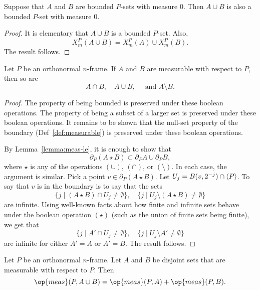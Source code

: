 \begin{lemma}  Suppose that $A$ and $B$ are bounded $P$-sets with
measure $0$.  Then $A\cup B$ is also a bounded $P$-set with measure
$0$.
\end{lemma}

\begin{proof}  It is elementary that $A\cup B$ is a bounded $P$-set.
Also, $$X^P_m(A\cup B) = X^P_m(A)\cup X^P_m(B).$$  The result
follows.
\end{proof}

\begin{lemma}
    Let $P$ be an orthonormal $n$-frame.
    If $A$ and $B$ are measurable with respect to $P$, then so are
    $$A\cap B,\quad A\cup B,\quad\text{ and }A\setminus B.$$
\end{lemma}

\begin{proof}  The property of being  bounded is preserved under
these boolean operations.  The property of being a subset of a
larger set is preserved under these boolean operations.  It remains
to be shown that the null-set property of the boundary
(Def~\ref{def:measurable}) is preserved under these boolean
operations.

By Lemma~\ref{lemma:meas-le}, it is enough to show that
    $$\partial_P (A \star B) \subset \partial_P A \cup \partial_P
    B,$$
where $\star$ is any of the operations $(\cup)$, $(\cap)$, or
$(\setminus)$.  In each case, the argument is similar.  Pick a point
$v\in\partial_P(A\star B)$. Let $U_j = B(v,2^{-j})\cap{\langle P\rangle}$. To
say that $v$ is in the boundary is to say that the sets
    $$
    \{j \mid (A\star B)\cap U_j\ne\emptyset\},\quad
    \{j \mid U_j\setminus (A\star B)\ne\emptyset\}
    $$
are infinite. Using well-known facts about how finite and infinite
sets behave under the boolean operation $(\star)$ (such as the union
of finite sets being finite), we get that
    $$
    \{j \mid A'\cap U_j\ne\emptyset\},\quad
    \{j \mid U_j\setminus A'\ne\emptyset\}
    $$
are infinite for either $A'=A$ or $A'=B$.  The result follows.
\end{proof}

\begin{lemma}\label{lemma:alg}  Let $P$ be an orthonormal $n$-frame.  Let $A$ and $B$
be disjoint sets that are measurable with respect to $P$.  Then
    $$\op{meas}(P,A\cup B) = \op{meas}(P,A) + \op{meas}(P,B).$$
\end{lemma}

